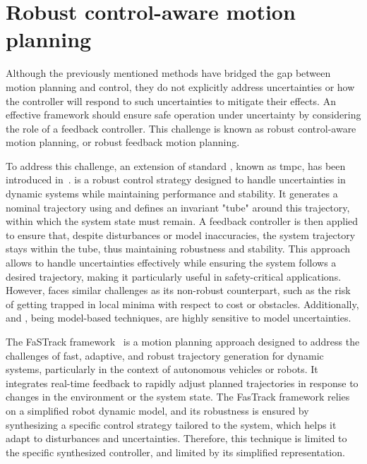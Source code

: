 \section{Robust control-aware motion planning}

Although the previously mentioned methods have bridged the gap between motion planning and control, they do not explicitly address uncertainties or how the controller will respond to such uncertainties to mitigate their effects.
An effective framework should ensure safe operation under uncertainty by considering the role of a feedback controller. 
This challenge is known as robust control-aware motion planning, or robust feedback motion planning.

To address this challenge, an extension of standard , known as \gls{tmpc}, has been introduced in~\cite{cTMPC}.
 is a robust control strategy designed to handle uncertainties in dynamic systems while maintaining performance and stability. 
It generates a nominal trajectory using  and defines an invariant "tube" around this trajectory, within which the system state must remain. 
A feedback controller is then applied to ensure that, despite disturbances or model inaccuracies, the system trajectory stays within the tube, thus maintaining robustness and stability. 
This approach allows  to handle uncertainties effectively while ensuring the system follows a desired trajectory, making it particularly useful in safety-critical applications.
However,  faces similar challenges as its non-robust counterpart, such as the risk of getting trapped in local minima with respect to cost or obstacles.
Additionally,  and , being model-based techniques, are highly sensitive to model uncertainties.

The FaSTrack framework~\cite{cFaSTrack} is a motion planning approach designed to address the challenges of fast, adaptive, and robust trajectory generation for dynamic systems, particularly in the context of autonomous vehicles or robots. 
It integrates real-time feedback to rapidly adjust planned trajectories in response to changes in the environment or the system state. 
The FasTrack framework relies on a simplified robot dynamic model, and its robustness is ensured by synthesizing a specific control strategy tailored to the system, which helps it adapt to disturbances and uncertainties.
Therefore, this technique is limited to the specific synthesized controller, and limited by its simplified representation.

